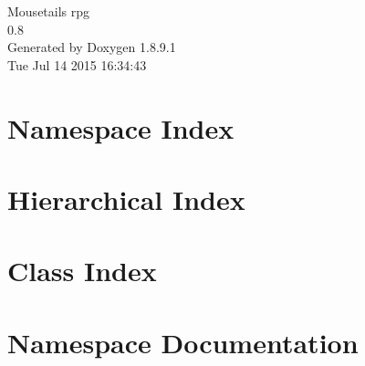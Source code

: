 \documentclass[twoside]{book}
\newcommand{\+}{\discretionary{\mbox{\scriptsize$\hookleftarrow$}}{}{}}
\newcommand{\clearemptydoublepage}{%
  \newpage{\pagestyle{empty}\cleardoublepage}%
}
\begin{document}
\hypersetup{pageanchor=false,
             bookmarks=true,
             bookmarksnumbered=true,
             pdfencoding=unicode
            }
\begin{titlepage}
\vspace*{7cm}
\begin{center}%
{\Large Mousetail\textquotesingle{}s rpg \\[1ex]\large 0.\+8 }\\
\vspace*{1cm}
{\large Generated by Doxygen 1.8.9.1}\\
\vspace*{0.5cm}
{\small Tue Jul 14 2015 16:34:43}\\
\end{center}
\end{titlepage}
\clearemptydoublepage
\tableofcontents
\clearemptydoublepage
{}
\hypersetup{pageanchor=true}

\chapter{Namespace Index}

\chapter{Hierarchical Index}

\chapter{Class Index}

\chapter{Namespace Documentation}














\end{document}
